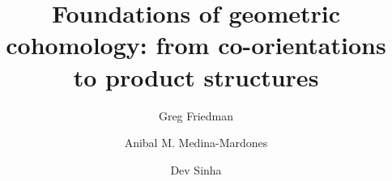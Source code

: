 \documentclass{amsart}
\title[Foundations of geometric cohomology]{Foundations of geometric cohomology: from co-orientations to product structures}
\author[G. Friedman]{Greg Friedman}
\author[A. Medina-Mardones]{Anibal M. Medina-Mardones}
\author[D. Sinha]{Dev Sinha}
\begin{document}
	
	\maketitle

	\tableofcontents

	
	

	\pagebreak
	
	
	
\end{document}
